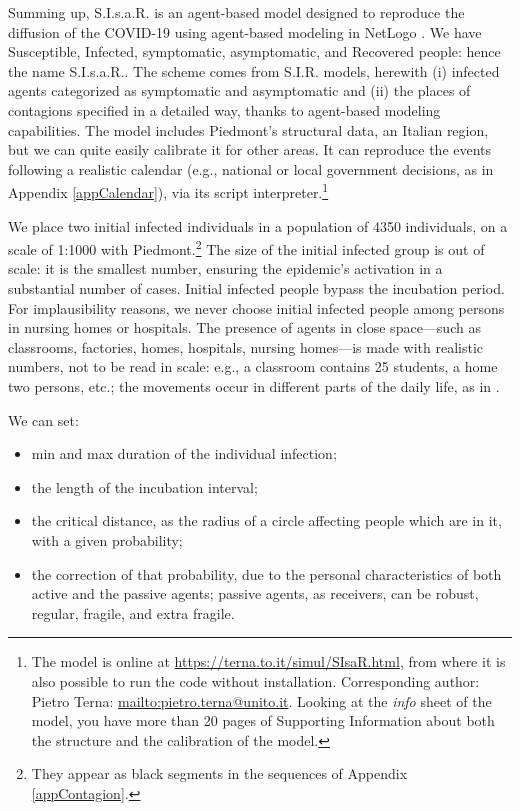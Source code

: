 \documentclass[11pt]{article}
\begin{document}
Summing up, S.I.s.a.R. \cite{SIsaR} is an agent-based model designed to reproduce the diffusion of the COVID-19 using agent-based modeling in NetLogo \citep{NetLogo}. We have Susceptible, Infected, symptomatic, asymptomatic, and Recovered people: hence the name S.I.s.a.R.. The scheme comes from S.I.R. models, herewith (i) infected agents categorized as symptomatic and asymptomatic and (ii) the places of contagions specified in a detailed way, thanks to agent-based modeling capabilities. The model includes Piedmont's structural data, an Italian region, but we can quite easily calibrate it for other areas. It can reproduce the events following a realistic calendar (e.g., national or local government decisions, as in Appendix \ref{appCalendar}), via its script interpreter.\footnote{\label{modOnLine}The model is online at \url{https://terna.to.it/simul/SIsaR.html}, from where it is also possible to run the code without installation. Corresponding author: Pietro Terna: \url{mailto:pietro.terna@unito.it}. Looking at the \emph{info} sheet of the model, you have more than 20 pages of Supporting Information about both the structure and the calibration of the model.}

We place two initial infected individuals in a population of 4350 individuals, on a scale of 1:1000 with Piedmont.\footnote{They appear as black segments in the sequences of Appendix \ref{appContagion}.} The size of the initial infected group is out of scale: it is the smallest number, ensuring the epidemic's activation in a substantial number of cases. Initial infected people bypass the incubation period. For implausibility reasons, we never choose initial infected people among persons in nursing homes or hospitals. The presence of agents in close space---such as classrooms, factories, homes, hospitals, nursing homes---is made with realistic numbers, not to be read in scale: e.g., a classroom contains 25 students, a home two persons, etc.; the movements occur in different parts of the daily life, as in \cite{ghorbani2020assocc}.

We can set: 
\begin{itemize}
\setlength\itemsep{0.3em}
\item min and max duration of the individual infection;

\item the length of the incubation interval;

\item the critical distance, as the radius of a circle affecting people which are in it, with a given probability;

\item the correction of that probability, due to the personal characteristics of both active and the passive agents; passive agents, as receivers, can be robust, regular, fragile, and extra fragile.

\end{itemize} 
\end{document}
